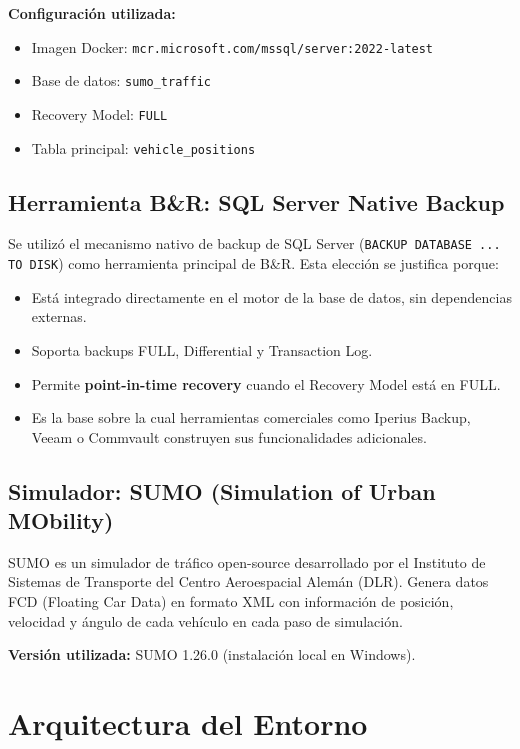 \documentclass[12pt,a4paper]{article}
\begin{document}
\textbf{Configuraci\'on utilizada:}
\begin{itemize}
  \item Imagen Docker: \texttt{mcr.microsoft.com/mssql/server:2022-latest}
  \item Base de datos: \texttt{sumo\_traffic}
  \item Recovery Model: \texttt{FULL}
  \item Tabla principal: \texttt{vehicle\_positions}
\end{itemize}

\subsection{Herramienta B\&R: SQL Server Native Backup}

Se utiliz\'o el mecanismo nativo de backup de SQL Server (\texttt{BACKUP DATABASE ... TO DISK}) como herramienta principal de B\&R. Esta elecci\'on se justifica porque:

\begin{itemize}
  \item Est\'a integrado directamente en el motor de la base de datos, sin dependencias externas.
  \item Soporta backups FULL, Differential y Transaction Log.
  \item Permite \textbf{point-in-time recovery} cuando el Recovery Model est\'a en FULL.
  \item Es la base sobre la cual herramientas comerciales como Iperius Backup, Veeam o Commvault construyen sus funcionalidades adicionales.
\end{itemize}

\subsection{Simulador: SUMO (Simulation of Urban MObility)}

SUMO es un simulador de tr\'afico open-source desarrollado por el Instituto de Sistemas de Transporte del Centro Aeroespacial Alem\'an (DLR). Genera datos FCD (Floating Car Data) en formato XML con informaci\'on de posici\'on, velocidad y \'angulo de cada veh\'iculo en cada paso de simulaci\'on.

\textbf{Versi\'on utilizada:} SUMO 1.26.0 (instalaci\'on local en Windows).

\section{Arquitectura del Entorno}
\end{document}
